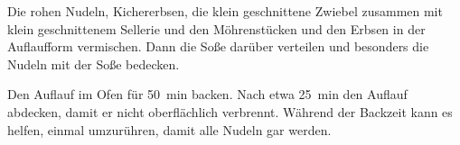 \begin{recipeDP}
{        \step Die rohen Nudeln, Kichererbsen, die klein geschnittene Zwiebel zusammen mit klein geschnittenem Sellerie und den Möhrenstücken und den Erbsen in der Auflaufform vermischen. Dann die Soße darüber verteilen und besonders die Nudeln mit der Soße bedecken.

        \step Den Auflauf im Ofen für \SI{50}{\minute} backen. Nach etwa \SI{25}{\minute} den Auflauf abdecken, damit er nicht oberflächlich verbrennt. Während der Backzeit kann es helfen, einmal umzurühren, damit alle Nudeln gar werden.
    }



\end{recipeDP}
